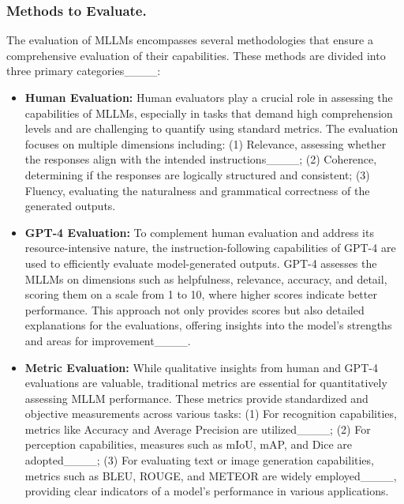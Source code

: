 \subsubsection{Methods to Evaluate.}
The evaluation of MLLMs encompasses several methodologies that ensure a comprehensive evaluation of their capabilities. These methods are divided into three primary categories____:
\begin{itemize}[leftmargin=*]
    \item \textbf{Human Evaluation:} Human evaluators play a crucial role in assessing the capabilities of MLLMs, especially in tasks that demand high comprehension levels and are challenging to quantify using standard metrics. The evaluation focuses on multiple dimensions including: 
    (1) Relevance, assessing whether the responses align with the intended instructions____; 
    (2) Coherence, determining if the responses are logically structured and consistent; 
    (3) Fluency, evaluating the naturalness and grammatical correctness of the generated outputs.

    \item \textbf{GPT-4 Evaluation:} To complement human evaluation and address its resource-intensive nature, the instruction-following capabilities of GPT-4 are used to efficiently evaluate model-generated outputs. GPT-4 assesses the MLLMs on dimensions such as helpfulness, relevance, accuracy, and detail, scoring them on a scale from 1 to 10, where higher scores indicate better performance. This approach not only provides scores but also detailed explanations for the evaluations, offering insights into the model's strengths and areas for improvement____.

    \item \textbf{Metric Evaluation:} While qualitative insights from human and GPT-4 evaluations are valuable, traditional metrics are essential for quantitatively assessing MLLM performance. These metrics provide standardized and objective measurements across various tasks:
    (1) For recognition capabilities, metrics like Accuracy and Average Precision are utilized____; 
    (2) For perception capabilities, measures such as mIoU, mAP, and Dice are adopted____; 
    (3) For evaluating text or image generation capabilities, metrics such as BLEU, ROUGE, and METEOR are widely employed____, providing clear indicators of a model's performance in various applications.
\end{itemize}


